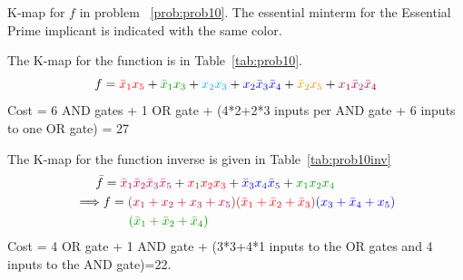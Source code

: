 \documentclass{article}
\newcommand{\bx}{\bar{x}}
\newcommand{\cred}{\color{red}}
\newcommand{\cg}{\color{green!60!black}}
\newcommand{\cb}{\color{blue}}
\newcommand\marktopleft[1]{%
  \tikz[overlay,remember picture] 
  \node (marker-#1-a) at (.3em,.3em) {};%
}
\newcommand\markbottomright[2]{%
  \tikz[overlay,remember picture] 
  \node (marker-#1-b) at (.1em,.3em) {};%
  \tikz[overlay,remember picture,inner sep=1pt]
  \node[draw={#2},rounded corners,fit=(marker-#1-a.north west) (marker-#1-b.south east)] {};%
}
\newcommand\markpolybottomright[1]{%
  \tikz[overlay,remember picture] 
  \node (marker-#1-br) at (.3em,.3em) {};%
  }
\newcommand\markpolybottomleft[2]{%
  \tikz[overlay,remember picture]
  \node (marker-#1-bl) at (.3em,.3em) {};%
  \tikz[overlay,remember picture,inner sep=1pt]
  \path [draw={#2},rounded corners]
  (marker-#1-tl.north west) --
  (marker-#1-tl.north east) --
  (marker-#1-bl.south east) --
  (marker-#1-br.south west);%
}
\begin{document}
\begin{table}[h]
  
  \caption{K-map for $f$ in problem ~\ref{prob:prob10}. The essential minterm for the Essential
  Prime implicant is indicated with the same color.}
\label{tab:prob10}
\end{table}

The K-map for the function is in Table~\ref{tab:prob10}.
\[
  f = {\cred \bx_1 x_5 } + {\cg \bx_1 x_3 } + {\color{cyan} x_2 x_3 }
  + {\cb x_2 \bx_3 \bx_4} + {\color{orange} \bx_2 x_5} 
  + {\color{purple} x_1 \bx_2 \bx_4}
\]
 Cost = 6 AND gates + 1 OR gate + (4*2+2*3 inputs per AND gate + 6 inputs to one OR gate) = 27

 The K-map for the function inverse is given in Table~\ref{tab:prob10inv}
 \begin{align*}
   \bar{f} &= {\color{purple} \bx_1 \bx_2 \bx_3 \bx_5} + {\cred x_1 x_2 x_3} + {\cb \bx_3 x_4 \bx_5 } + {\cg x_1 x_2 x_4}
   \\
   \implies  &f = {\color{purple} (x_1 + x_2 + x_3 + x_5)}{\cred (\bx_1 + \bx_2 + \bx_3)}{\cb (x_3 + \bx_4 + x_5)}
               \\&\qquad{\cg (\bx_1 + \bx_2 + \bx_4)}
 \end{align*}
 Cost = 4 OR gate + 1 AND gate + (3*3+4*1 inputs to the OR gates and 4 inputs to the AND gate)=22.
 
\end{document}
